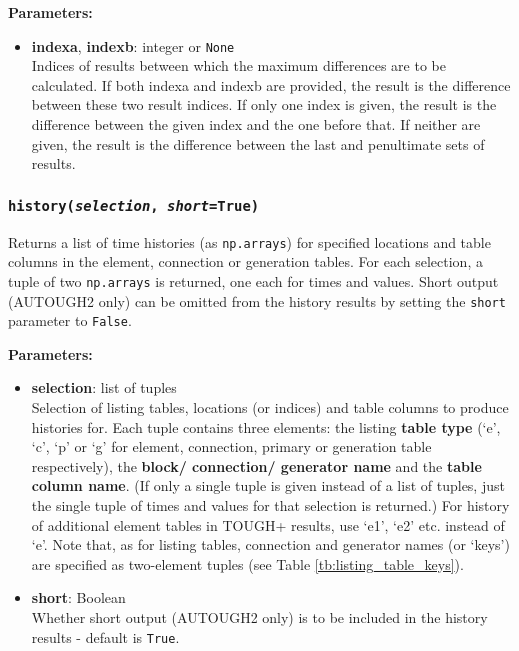\textbf{Parameters:}
\begin{itemize}
\item \textbf{indexa}, \textbf{indexb}: integer or \texttt{None}\\
  Indices of results between which the maximum differences are to be calculated.  If both indexa and indexb are provided, the result is the difference between these two result indices.  If only one index is given, the result is the difference between the given index and the one before that.  If neither are given, the result is the difference between the last and penultimate sets of results.
\end{itemize}

\begin{snugshade}
\subsubsection{\texttt{history(\emph{selection}, \emph{short}=True)}}
\end{snugshade}
\label{sec:t2listing:history}

Returns a list of time histories (as \texttt{np.arrays}) for specified locations and table columns in the element, connection or generation tables.  For each selection, a tuple of two \texttt{np.arrays} is returned, one each for times and values.  Short output (AUTOUGH2 only) can be omitted from the history results by setting the \texttt{short} parameter to \texttt{False}.

\textbf{Parameters:}
\begin{itemize}
\item \textbf{selection}: list of tuples\\
  Selection of listing tables, locations (or indices) and table columns to produce histories for.  Each tuple contains three elements: the listing \textbf{table type} (`e', `c', `p' or `g' for element, connection, primary or generation table respectively), the \textbf{block/ connection/ generator name} and the \textbf{table column name}.  (If only a single tuple is given instead of a list of tuples, just the single tuple of times and values for that selection is returned.)  For history of additional element tables in TOUGH+ results, use `e1', `e2' etc. instead of `e'.  Note that, as for listing tables, connection and generator names (or `keys') are specified as two-element tuples (see Table \ref{tb:listing_table_keys}).

\item \textbf{short}: Boolean\\
  Whether short output (AUTOUGH2 only) is to be included in the history results - default is \texttt{True}.
\end{itemize}

